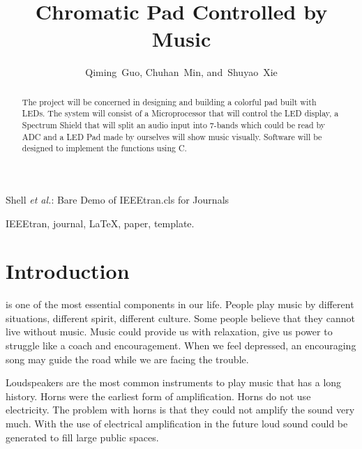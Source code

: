 \documentclass[12pt,a4paper,journal]{IEEEtran}
\begin{document}
\title{Chromatic Pad Controlled by Music}


\author{Qiming~Guo,
        Chuhan~Min,
        and~Shuyao~Xie%
        }


%
{Shell \MakeLowercase{\textit{et al.}}: Bare Demo of IEEEtran.cls for Journals}

\maketitle

\begin{abstract}
The project will be concerned in designing and building a colorful pad built with LEDs. The system will consist of a Microprocessor that will control the LED display, a Spectrum Shield that will split an audio input into 7-bands which could be read by ADC and a LED Pad made by ourselves will show music visually. Software will be designed to implement the functions using C. 
\end{abstract}

\begin{IEEEkeywords}
IEEEtran, journal, \LaTeX, paper, template.
\end{IEEEkeywords}

\section{Introduction}
 is one of the most essential components in our life. People play music by different situations, different spirit, different culture. Some people believe that they cannot live without music. Music could provide us with relaxation, give us power to struggle like a coach and encouragement. When we feel depressed, an encouraging song may guide the road while we are facing the trouble.

Loudspeakers are the most common instruments to play music that has a long history. Horns were the earliest form of amplification. Horns do not use electricity. The problem with horns is that they could not amplify the sound very much. With the use of electrical amplification in the future loud sound could be generated to fill large public spaces.
\end{document}
